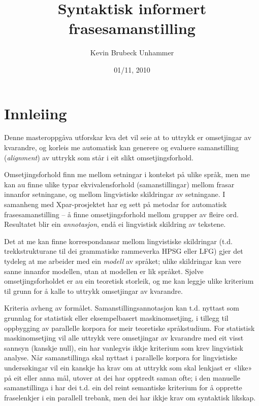\documentclass[11pt,a4paper,oneside,draft]{book}
\title{Syntaktisk informert frasesamanstilling }
\author{Kevin Brubeck Unhammer}
\date{01/11, 2010}
\begin{document}
\maketitle

\setcounter{tocdepth}{4}
\tableofcontents
\vspace*{1cm}


\chapter{Innleiing}
\label{sec-1}

\label{SEC:innleiing}


Denne masteroppgåva utforskar kva det vil seie at to uttrykk er
omsetjingar av kvarandre, og korleis me automatisk kan generere og
evaluere samanstilling (\emph{alignment}) av uttrykk som
står i eit slikt omsetjingsforhold. 

Omsetjingsforhold finn me mellom setningar i kontekst på ulike språk,
men me kan au finne ulike typar ekvivalensforhold (samanstillingar)
mellom frasar innanfor setningane, og mellom lingvistiske
skildringar av setningane. I samanheng med Xpar-prosjektet
\citep{xpar2008rcn} har eg sett på metodar for automatisk
frasesamanstilling – å finne omsetjingsforhold mellom grupper av
fleire ord. Resultatet blir ein \emph{annotasjon}, endå ei lingvistisk
skildring av tekstene.



Det at me kan finne korrespondansar mellom lingvistiske skildringar
(t.d. trekkstrukturane til dei grammatiske rammeverka HPSG eller LFG)
gjer det tydeleg at me arbeider med ein \emph{modell} av språket; ulike
skildringar kan vere sanne innanfor modellen, utan at modellen er lik
språket. Sjølve omsetjingsforholdet er au ein teoretisk storleik, og
me kan leggje ulike kriterium til grunn for å kalle to uttrykk
omsetjingar av kvarandre.

Kriteria avheng av formålet. Samanstillingsannotasjon kan t.d. nyttast
som grunnlag for statistisk eller eksempelbasert maskinomsetjing, i
tillegg til oppbygging av parallelle korpora for meir teoretiske
språkstudium.  For statistisk maskinomsetjing vil alle uttrykk vere
omsetjingar av kvarandre med eit visst sannsyn (kanskje null), ein
har vanlegvis ikkje kriterium som krev lingvistisk analyse. Når
samanstillinga skal nyttast i parallelle korpora for lingvistiske
undersøkingar vil ein kanskje ha krav om at uttrykk som skal lenkjast
er «like» på eit eller anna mål, utover at dei har opptredt saman
ofte; i den manuelle samanstillinga i \citet{samuelsson2006pap} har
dei t.d. ein del reint semantiske kriterium for å opprette
fraselenkjer i ein parallell trebank, men dei har ikkje krav om
syntaktisk likskap.
\end{document}
